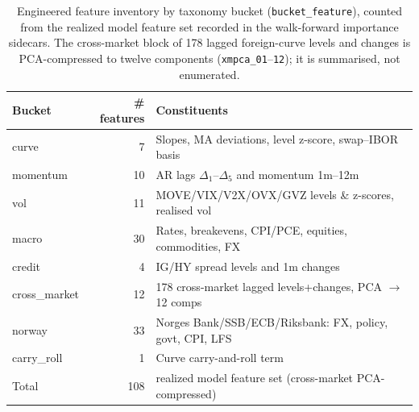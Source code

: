 \begin{table}[htbp]
\centering
\caption{Engineered feature inventory by taxonomy bucket (\texttt{bucket\_feature}), counted from the realized model feature set recorded in the walk-forward importance sidecars. The cross-market block of 178 lagged foreign-curve levels and changes is PCA-compressed to twelve components (\texttt{xmpca\_01}--\texttt{12}); it is summarised, not enumerated.}
\label{tab:app_features}
\footnotesize
\begin{tabular}{lrl}
\toprule
Bucket & \# features & Constituents \\
\midrule
curve & 7 & Slopes, MA deviations, level z-score, swap--IBOR basis \\
momentum & 10 & AR lags $\Delta_1$--$\Delta_5$ and momentum 1m--12m \\
vol & 11 & MOVE/VIX/V2X/OVX/GVZ levels \& z-scores, realised vol \\
macro & 30 & Rates, breakevens, CPI/PCE, equities, commodities, FX \\
credit & 4 & IG/HY spread levels and 1m changes \\
cross\_market & 12 & 178 cross-market lagged levels+changes, PCA $\to$ 12 comps \\
norway & 33 & Norges Bank/SSB/ECB/Riksbank: FX, policy, govt, CPI, LFS \\
carry\_roll & 1 & Curve carry-and-roll term \\
\midrule Total & 108 & realized model feature set (cross-market PCA-compressed) \\
\bottomrule
\end{tabular}
\end{table}

